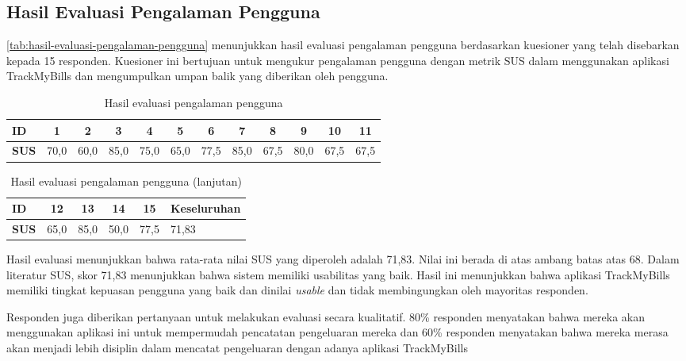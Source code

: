 \subsection{Hasil Evaluasi Pengalaman Pengguna}
\label{subsec:hasil-evaluasi-pengalaman-pengguna}

\autoref{tab:hasil-evaluasi-pengalaman-pengguna} menunjukkan hasil evaluasi pengalaman pengguna berdasarkan kuesioner yang telah disebarkan kepada 15 responden. Kuesioner ini bertujuan untuk mengukur pengalaman pengguna dengan metrik SUS dalam menggunakan aplikasi TrackMyBills dan mengumpulkan umpan balik yang diberikan oleh pengguna. 

\begin{table}[h!]
\centering
\caption{Hasil evaluasi pengalaman pengguna}
\label{tab:hasil-evaluasi-pengalaman-pengguna}
\begin{tabularx}{\linewidth}{|l|*{11}{c|}}
\hline
\textbf{ID} & 1 & 2 & 3 & 4 & 5 & 6 & 7 & 8 & 9 & 10 & 11 \\ \hline
\textbf{SUS} & 70,0 & 60,0 & 85,0 & 75,0 & 65,0 & 77,5 & 85,0 & 67,5 & 80,0 & 67,5 & 67,5 \\ \hline
\end{tabularx}
\end{table}

\begin{table}[h!]
    \ContinuedFloat
\centering
\caption{Hasil evaluasi pengalaman pengguna (lanjutan)}
\begin{tabularx}{\textwidth}{|l|*{4}{c|}X|}
\hline
\textbf{ID} & 12 & 13 & 14 & 15 & Keseluruhan \\ \hline
\textbf{SUS} & 65,0 & 85,0 & 50,0 & 77,5 & 71,83 \\ \hline
\end{tabularx}
\end{table}

Hasil evaluasi menunjukkan bahwa rata-rata nilai SUS yang diperoleh adalah 71,83. Nilai ini berada di atas ambang batas atas 68. Dalam literatur SUS, skor 71,83 menunjukkan bahwa sistem memiliki usabilitas yang baik. Hasil ini menunjukkan bahwa aplikasi TrackMyBills memiliki tingkat kepuasan pengguna yang baik dan dinilai \emph{usable} dan tidak membingungkan oleh mayoritas responden.

Responden juga diberikan pertanyaan untuk melakukan evaluasi secara kualitatif. 80\% responden menyatakan bahwa mereka akan menggunakan aplikasi ini untuk mempermudah pencatatan pengeluaran mereka dan 60\% responden menyatakan bahwa mereka merasa akan menjadi lebih disiplin dalam mencatat pengeluaran dengan adanya aplikasi TrackMyBills

